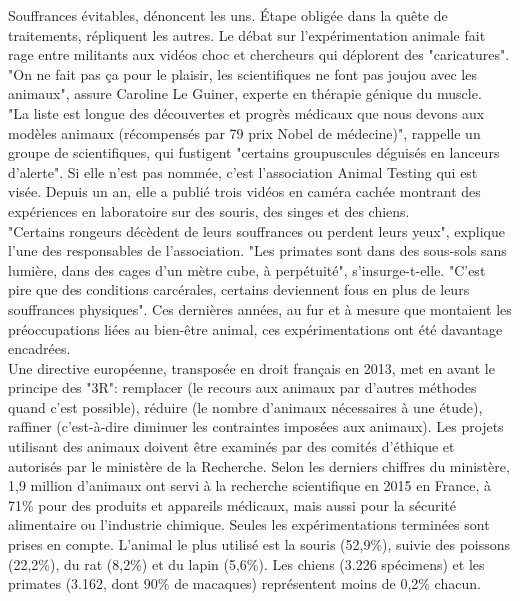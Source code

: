\documentclass[10pt]{article}
\begin{document}
Souffrances évitables, dénoncent les uns. Étape obligée dans la quête de traitements, répliquent les autres. Le débat sur l'expérimentation animale fait rage entre militants aux vidéos choc et chercheurs qui déplorent des "caricatures". "On ne fait pas ça pour le plaisir, les scientifiques ne font pas joujou avec les animaux", assure Caroline Le Guiner, experte en thérapie génique du muscle. \\

"La liste est longue des découvertes et progrès médicaux que nous devons aux modèles animaux (récompensés par 79 prix Nobel de médecine)", rappelle un groupe de scientifiques, qui fustigent "certains groupuscules déguisés en lanceurs d'alerte". Si elle n'est pas nommée, c'est l'association Animal Testing qui est visée. Depuis un an, elle a publié trois vidéos en caméra cachée montrant des expériences en laboratoire sur des souris, des singes et des chiens.\\

"Certains rongeurs décèdent de leurs souffrances ou perdent leurs yeux", explique l'une des responsables de l'association. "Les primates sont dans des sous-sols sans lumière, dans des cages d'un mètre cube, à perpétuité", s'insurge-t-elle. "C'est pire que des conditions carcérales, certains deviennent fous en plus de leurs souffrances physiques". Ces dernières années, au fur et à mesure que montaient les préoccupations liées au bien-être animal, ces expérimentations ont été davantage encadrées. \\

Une directive européenne, transposée en droit français en 2013, met en avant le principe des "3R": remplacer (le recours aux animaux par d'autres méthodes quand c'est possible), réduire (le nombre d'animaux nécessaires à une étude), raffiner (c'est-à-dire diminuer les contraintes imposées aux animaux). Les projets utilisant des animaux doivent être examinés par des comités d'éthique et autorisés par le ministère de la Recherche.
Selon les derniers chiffres du ministère, 1,9 million d'animaux ont servi à la recherche scientifique en 2015 en France, à 71\% pour des produits et appareils médicaux, mais aussi pour la sécurité alimentaire ou l'industrie chimique. Seules les expérimentations terminées sont prises en compte. L'animal le plus utilisé est la souris (52,9\%), suivie des poissons (22,2\%), du rat (8,2\%) et du lapin (5,6\%). Les chiens (3.226 spécimens) et les primates (3.162, dont 90\% de macaques) représentent moins de 0,2\% chacun.\\
\end{document}
